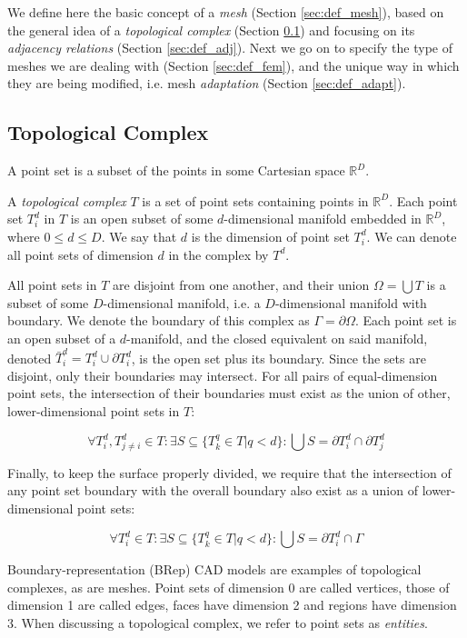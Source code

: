 We define here the basic concept of a \emph{mesh}
(Section \ref{sec:def_mesh}), based on the general
idea of a \emph{topological complex} (Section \ref{sec:def_complex})
and focusing on its \emph{adjacency relations} (Section \ref{sec:def_adj}).
Next we go on to specify the type of meshes we
are dealing with (Section \ref{sec:def_fem}),
and the unique way in which they are being modified,
i.e. mesh \emph{adaptation} (Section \ref{sec:def_adapt}).

\subsection{Topological Complex}
\label{sec:def_complex}

A point set is a subset of the points in some Cartesian
space $\mathbb{R}^D$.

A \emph{topological complex} $T$ is a set of point sets
containing points in $\mathbb{R}^D$.
Each point set $T^d_i$ in $T$ is an open subset of some
$d$-dimensional manifold embedded in $\mathbb{R}^D$,
where $0\leq d \leq D$.
We say that $d$ is the dimension of point set $T^d_i$.
We can denote all point sets of dimension $d$ in the
complex by $T^d$.

All point sets in $T$ are disjoint from one another,
and their union $\Omega = \bigcup T$ is a subset of some $D$-dimensional
manifold, i.e. a $D$-dimensional manifold with boundary.
We denote the boundary of this complex as $\Gamma = \partial\Omega$.
Each point set is an open subset of a $d$-manifold,
and the closed equivalent on said manifold,
denoted $\bar{T}^d_i = T^d_i \cup \partial T^d_i$,
is the open set plus its boundary.
Since the sets are disjoint, only their boundaries may intersect.
For all pairs of equal-dimension point sets, the intersection
of their boundaries must exist as the union of other,
lower-dimensional point sets in $T$:

\[\forall T^d_i,T^d_{j\neq i} \in T: \exists S \subseteq \{T^q_k \in T \big| q < d\}:
\bigcup S = \partial T^d_i \cap \partial T^d_j\]

Finally, to keep the surface properly divided, we require that
the intersection of any point set boundary with the overall
boundary also exist as a union of lower-dimensional point sets:

\[\forall T^d_i \in T: \exists S \subseteq \{T^q_k \in T \big| q < d\}:
\bigcup S = \partial T^d_i \cap \Gamma\]

Boundary-representation (BRep) CAD models are examples
of topological complexes, as are meshes.
Point sets of dimension 0 are called vertices, those
of dimension 1 are called edges, faces have dimension 2
and regions have dimension 3.
When discussing a topological complex, we
refer to point sets as \emph{entities}.

